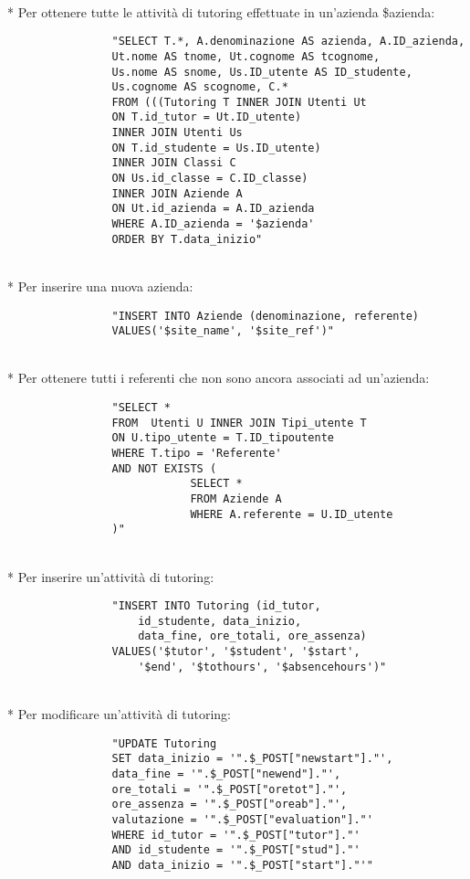 \documentclass[12pt]{article}
\begin{document}
\\*
\newpage
\noindent
Per ottenere tutte le attività di tutoring effettuate in un'azienda \$azienda:
\begin{verbatim}
                "SELECT T.*, A.denominazione AS azienda, A.ID_azienda, 
                Ut.nome AS tnome, Ut.cognome AS tcognome,
                Us.nome AS snome, Us.ID_utente AS ID_studente, 
                Us.cognome AS scognome, C.*
                FROM (((Tutoring T INNER JOIN Utenti Ut 
                ON T.id_tutor = Ut.ID_utente)
                INNER JOIN Utenti Us 
                ON T.id_studente = Us.ID_utente)
                INNER JOIN Classi C
                ON Us.id_classe = C.ID_classe)
                INNER JOIN Aziende A
                ON Ut.id_azienda = A.ID_azienda
                WHERE A.ID_azienda = '$azienda'
                ORDER BY T.data_inizio"
\end{verbatim}

\\*
\noindent
Per inserire una nuova azienda:
\begin{verbatim}
                "INSERT INTO Aziende (denominazione, referente)
                VALUES('$site_name', '$site_ref')"
\end{verbatim}

\\*
\noindent
Per ottenere tutti i referenti che non sono ancora associati ad un'azienda:
\begin{verbatim}
                "SELECT * 
                FROM  Utenti U INNER JOIN Tipi_utente T
                ON U.tipo_utente = T.ID_tipoutente
                WHERE T.tipo = 'Referente'
                AND NOT EXISTS (
                            SELECT * 
                            FROM Aziende A
                            WHERE A.referente = U.ID_utente
                )"
\end{verbatim}

\\*
\noindent
Per inserire un'attività di tutoring:
\begin{verbatim}
                "INSERT INTO Tutoring (id_tutor, 
                    id_studente, data_inizio, 
                    data_fine, ore_totali, ore_assenza)
                VALUES('$tutor', '$student', '$start', 
                    '$end', '$tothours', '$absencehours')"
\end{verbatim}


\\*
\noindent
\newpage
Per modificare un'attività di tutoring:
\begin{verbatim}
                "UPDATE Tutoring 
                SET data_inizio = '".$_POST["newstart"]."',
                data_fine = '".$_POST["newend"]."',
                ore_totali = '".$_POST["oretot"]."',
                ore_assenza = '".$_POST["oreab"]."',
                valutazione = '".$_POST["evaluation"]."'
                WHERE id_tutor = '".$_POST["tutor"]."'
                AND id_studente = '".$_POST["stud"]."'
                AND data_inizio = '".$_POST["start"]."'"
\end{verbatim}
\end{document}
